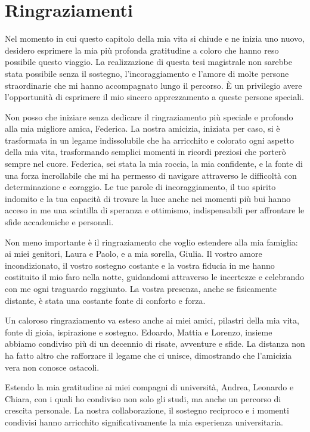 \chapter*{Ringraziamenti}
\pagestyle{empty}

Nel momento in cui questo capitolo della mia vita si chiude e ne inizia uno nuovo, desidero esprimere la mia più profonda gratitudine a coloro che hanno reso possibile questo viaggio. La realizzazione di questa tesi magistrale non sarebbe stata possibile senza il sostegno, l'incoraggiamento e l'amore di molte persone straordinarie che mi hanno accompagnato lungo il percorso. È un privilegio avere l'opportunità di esprimere il mio sincero apprezzamento a queste persone speciali.

Non posso che iniziare senza dedicare il ringraziamento più speciale e profondo alla mia migliore amica, Federica. La nostra amicizia, iniziata per caso, si è trasformata in un legame indissolubile che ha arricchito e colorato ogni aspetto della mia vita, trasformando semplici momenti in ricordi preziosi che porterò sempre nel cuore. Federica, sei stata la mia roccia, la mia confidente, e la fonte di una forza incrollabile che mi ha permesso di navigare attraverso le difficoltà con determinazione e coraggio. Le tue parole di incoraggiamento, il tuo spirito indomito e la tua capacità di trovare la luce anche nei momenti più bui hanno acceso in me una scintilla di speranza e ottimismo, indispensabili per affrontare le sfide accademiche e personali.

Non meno importante è il ringraziamento che voglio estendere alla mia famiglia: ai miei genitori, Laura e Paolo, e a mia sorella, Giulia. Il vostro amore incondizionato, il vostro sostegno costante e la vostra fiducia in me hanno costituito il mio faro nella notte, guidandomi attraverso le incertezze e celebrando con me ogni traguardo raggiunto. La vostra presenza, anche se fisicamente distante, è stata una costante fonte di conforto e forza.

Un caloroso ringraziamento va esteso anche ai miei amici, pilastri della mia vita, fonte di gioia, ispirazione e sostegno. Edoardo, Mattia e Lorenzo, insieme abbiamo condiviso più di un decennio di risate, avventure e sfide. La distanza non ha fatto altro che rafforzare il legame che ci unisce, dimostrando che l'amicizia vera non conosce ostacoli.

Estendo la mia gratitudine ai miei compagni di università, Andrea, Leonardo e Chiara, con i quali ho condiviso non solo gli studi, ma anche un percorso di crescita personale. La nostra collaborazione, il sostegno reciproco e i momenti condivisi hanno arricchito significativamente la mia esperienza universitaria.


